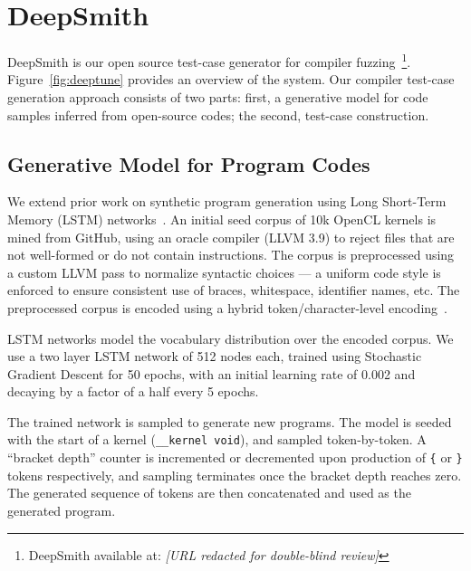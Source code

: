 \section{DeepSmith}

DeepSmith is our open source test-case generator for compiler fuzzing~\footnote{DeepSmith available at: \emph{[URL redacted for double-blind review]}}. Figure~\ref{fig:deeptune} provides an overview of the system. Our compiler test-case generation approach consists of two parts: first, a generative model for code samples inferred from open-source codes; the second, test-case construction.


\subsection{Generative Model for Program Codes}

We extend prior work on synthetic program generation using Long Short-Term Memory (LSTM) networks~\cite{Cummins2017a}. An initial seed corpus of 10k OpenCL kernels is mined from GitHub, using an oracle compiler (LLVM 3.9) to reject files that are not well-formed or do not contain instructions. The corpus is preprocessed using a custom LLVM pass to normalize syntactic choices --- a uniform code style is enforced to ensure consistent use of braces, whitespace, identifier names, etc. The preprocessed corpus is encoded using a hybrid token/character-level encoding~\cite{Cummins2017b}. 

LSTM networks model the vocabulary distribution over the encoded corpus. We use a two layer LSTM network of 512 nodes each, trained using Stochastic Gradient Descent for 50 epochs, with an initial learning rate of 0.002 and decaying by a factor of a half every 5 epochs. %

The trained network is sampled to generate new programs. The model is seeded with the start of a kernel (\texttt{\_\_kernel void}), and sampled token-by-token. A ``bracket depth'' counter is incremented or decremented upon production of \texttt{\{} or \texttt{\}} tokens respectively, and sampling terminates once the bracket depth reaches zero. The generated sequence of tokens are then concatenated and used as the generated program.


